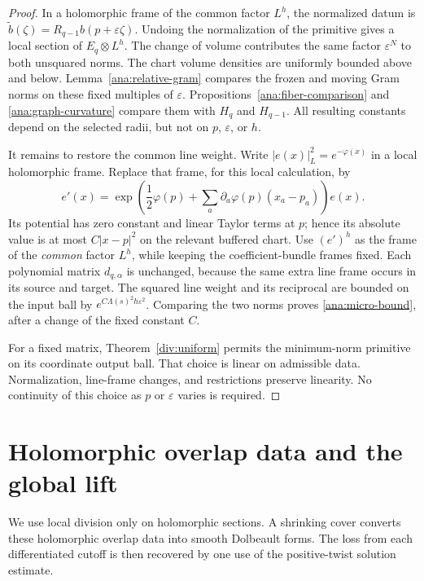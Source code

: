 \documentclass[11pt,reqno]{amsart}
\numberwithin{equation}{section}
\theoremstyle{definition}
\theoremstyle{remark}
\begin{document}
\begin{proof}
In a holomorphic frame of the common factor $L^h$, the normalized
datum is $\widetilde b(\zeta)=R_{q-1}b(p+\varepsilon\zeta)$.
Undoing the normalization of the primitive gives a local section of
$E_q\otimes L^h$.  The change of volume contributes the same
factor $\varepsilon^N$ to both unsquared norms.  The chart volume
densities are uniformly bounded above and below.
Lemma~\ref{ana:relative-gram} compares the frozen and moving Gram
norms on these fixed multiples of $\varepsilon$.
Propositions~\ref{ana:fiber-comparison} and
\ref{ana:graph-curvature} compare them with $H_q$ and $H_{q-1}$.
All resulting constants depend on the selected radii, but not on
$p$, $\varepsilon$, or $h$.

It remains to restore the common line weight.  Write
$|e(x)|_L^2=e^{-\varphi(x)}$ in a local holomorphic frame.  Replace
that frame, for this local calculation, by
\[
 e'(x)=
 \exp\!\left(\frac12\varphi(p)
        +\sum_a\partial_a\varphi(p)(x_a-p_a)\right)e(x).
\]
Its potential has zero constant and linear Taylor terms at $p$;
hence its absolute value is at most $C|x-p|^2$ on the relevant
buffered chart.  Use $(e')^h$ as the frame of the \emph{common}
factor $L^h$, while keeping the coefficient-bundle frames fixed.
Each polynomial matrix $d_{q,\alpha}$ is unchanged, because the
same extra line frame occurs in its source and target.
The squared line weight and its reciprocal are bounded on the
input ball by $e^{C\Lambda(s)^2h\varepsilon^2}$.
Comparing the two norms proves \eqref{ana:micro-bound}, after a
change of the fixed constant $C$.

For a fixed matrix, Theorem~\ref{div:uniform} permits the
minimum-norm primitive on its coordinate output ball.  That choice
is linear on admissible data.  Normalization, line-frame changes,
and restrictions preserve linearity.  No continuity of this choice
as $p$ or $\varepsilon$ varies is required.
\end{proof}

\section{Holomorphic overlap data and the global lift}
\label{ana:global-section}

We use local division only on holomorphic sections.  A shrinking
cover converts these holomorphic overlap data into smooth Dolbeault
forms.  The loss from each differentiated cutoff is then recovered
by one use of the positive-twist solution estimate.
\end{document}

